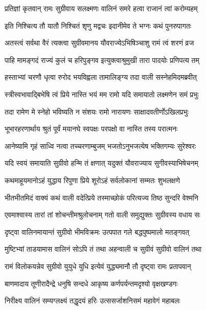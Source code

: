 \twolineshloka
{प्रतिज्ञां कृतवान् रामः सुग्रीवाय सलक्ष्मणः}
{वालिनं समरे हत्वा राजानं त्वां करोम्यहम्} %

\twolineshloka
{इति निश्चित्य तौ यातौ निश्चितं शृणु मद्वचः}
{इदानीमेव ते भग्नः कथं पुनरुपागतः} %

\twolineshloka
{अतस्त्वं सर्वथा वैरं त्यक्त्वा सुग्रीवमानय}
{यौवराज्येऽभिषिञ्चाशु रामं त्वं शरणं व्रज} %

\twolineshloka
{पाहि मामङ्गदं राज्यं कुलं च हरिपुङ्गव}
{इत्युक्त्वाश्रुमुखी तारा पादयोः प्रणिपत्य तम्} %

\twolineshloka
{हस्ताभ्यां चरणौ धृत्वा रुरोद भयविह्वला}
{तामालिङ्ग्य तदा वाली सस्नेहमिदमब्रवीत्} %

\twolineshloka
{स्त्रीस्वभावाद्बिभेषि त्वं प्रिये नास्ति भयं मम}
{रामो यदि समायातो लक्ष्मणेन समं प्रभुः} %

\twolineshloka
{तदा रामेण मे स्नेहो भविष्यति न संशयः}
{रामो नारायणः साक्षादवतीर्णोऽखिलप्रभुः} %

\twolineshloka
{भूभारहरणार्थाय श्रुतं पूर्वं मयानघे}
{स्वपक्षः परपक्षो वा नास्ति तस्य परात्मनः} %

\twolineshloka
{आनेष्यामि गृहं साध्वि नत्वा तच्चरणाम्बुजम्}
{भजतोऽनुभजत्येष भक्तिगम्यः सुरेश्वरः} %

\twolineshloka
{यदि स्वयं समायाति सुग्रीवो हन्मि तं क्षणात्}
{यदुक्तं यौवराज्याय सुगीवस्याभिषेचनम्} %

\twolineshloka
{कथमाहूयमानोऽहं युद्धाय रिपुणा प्रिये}
{शूरोऽहं सर्वलोकानां सम्मतः शुभलक्षणे} %

\twolineshloka
{भीतभीतमिदं वाक्यं कथं वाली वदेत्प्रिये}
{तस्माच्छोकं परित्यज्य तिष्ठ सुन्दरि वेश्मनि} %

\twolineshloka
{एवमाश्वास्य तारां तां शोचन्तीमश्रुलोचनाम्}
{गतो वाली समुद्युक्तः सुग्रीवस्य वधाय सः} %

\twolineshloka
{दृष्ट्वा वालिनमायान्तं सुग्रीवो भीमविक्रमः}
{उत्पपात गले बद्धपुष्पमालो मतङ्गवत्} %

\twolineshloka
{मुष्टिभ्यां ताडयामास वालिनं सोऽपि तं तथा}
{अहन्वाली च सुग्रीवं सुग्रीवो वालिनं तथा} %

\twolineshloka
{रामं विलोकयन्नेव सुग्रीवो युयुधे युधि}
{इत्येवं युद्ध्यमानौ तौ दृष्ट्वा रामः प्रतापवान्} %

\twolineshloka
{बाणमादाय तूणीरादैन्द्रे धनुषि सन्दधे}
{आकृष्य कर्णपर्यन्तमदृश्यो वृक्षखण्डगः} %

\twolineshloka
{निरीक्ष्य वालिनं सम्यग्लक्ष्यं तद्धृदयं हरिः}
{उत्ससर्जाशनिसमं महावेगं महाबलः} %

